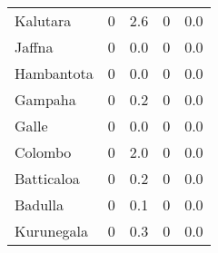 \begin{tabular}{lrrrr}
Kalutara     &              0 &                 2.6 &              0 &                 0.0 \\
Jaffna       &              0 &                 0.0 &              0 &                 0.0 \\
Hambantota   &              0 &                 0.0 &              0 &                 0.0 \\
Gampaha      &              0 &                 0.2 &              0 &                 0.0 \\
Galle        &              0 &                 0.0 &              0 &                 0.0 \\
Colombo      &              0 &                 2.0 &              0 &                 0.0 \\
Batticaloa   &              0 &                 0.2 &              0 &                 0.0 \\
Badulla      &              0 &                 0.1 &              0 &                 0.0 \\
Kurunegala   &              0 &                 0.3 &              0 &                 0.0 \\
\bottomrule
\end{tabular}
